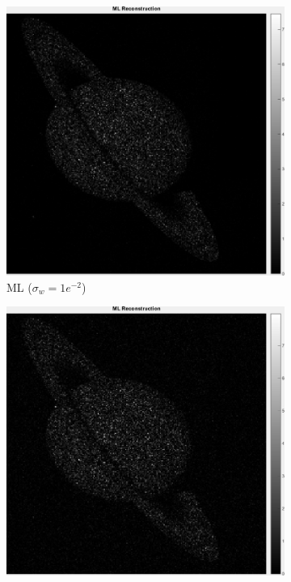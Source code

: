 \documentclass[a4paper, 11pt]{article}
\begin{document}
\begin{figure}[h]
\centering
\centering
    \begin{subfigure}[b]{0.22\textwidth}
        \includegraphics[width=\textwidth]{../Figures/MLReconstructionNoiseSigma1e-2.png}
        \caption{ML ($\sigma_w=1e^{-2}$)}
        \label{fig:ML-2}
    \end{subfigure}
    \begin{subfigure}[b]{0.22\textwidth}
        \includegraphics[width=\textwidth]{../Figures/MLReconstructionNoiseSigma1e-1.png}

\end{subfigure}
\end{figure}
\end{document}

